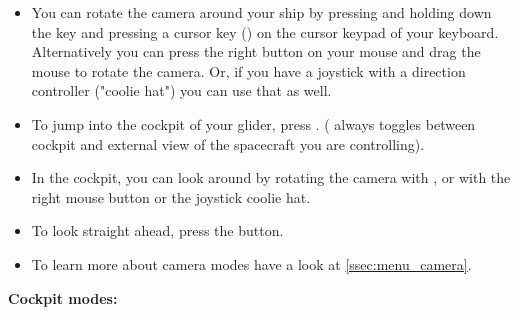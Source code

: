 \documentclass[Orbiter User Manual.tex]{subfiles}
\begin{document}
\begin{itemize}
\item You can rotate the camera around your ship by pressing and holding down the \Ctrl key and pressing a cursor key (\DArrow\UArrow\RArrow\LArrow) on the cursor keypad of your keyboard. Alternatively you can press the right button on your mouse and drag the mouse to rotate the camera. Or, if you have a joystick with a direction controller ("coolie hat") you can use that as well.
\item To jump into the cockpit of your glider, press . ( always toggles between cockpit and external view of the spacecraft you are controlling).
\item In the cockpit, you can look around by rotating the camera with \Alt\DArrow\UArrow\RArrow\LArrow, or with the right mouse button or the joystick coolie hat.
\item To look straight ahead, press the \Home button.
\item To learn more about camera modes have a look at \ref{ssec:menu_camera}.
\end{itemize}

\noindent
\textbf{Cockpit modes:}
\end{document}
